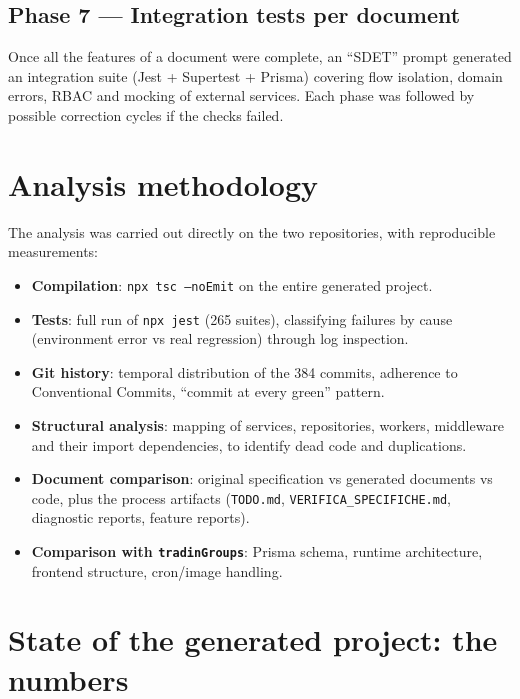 \documentclass[11pt,a4paper]{article}
\newcommand{\file}[1]{\texttt{\small #1}}
\begin{document}
\subsection{Phase 7 --- Integration tests per document}
Once all the features of a document were complete, an ``SDET'' prompt generated an integration suite (Jest + Supertest + Prisma) covering flow isolation, domain errors, RBAC and mocking of external services. Each phase was followed by possible correction cycles if the checks failed.

\section{Analysis methodology}

The analysis was carried out directly on the two repositories, with reproducible measurements:

\begin{itemize}[leftmargin=1.5em]
  \item \textbf{Compilation}: \file{npx tsc --noEmit} on the entire generated project.
  \item \textbf{Tests}: full run of \file{npx jest} (265 suites), classifying failures by cause (environment error vs real regression) through log inspection.
  \item \textbf{Git history}: temporal distribution of the 384 commits, adherence to Conventional Commits, ``commit at every green'' pattern.
  \item \textbf{Structural analysis}: mapping of services, repositories, workers, middleware and their import dependencies, to identify dead code and duplications.
  \item \textbf{Document comparison}: original specification vs generated documents vs code, plus the process artifacts (\file{TODO.md}, \file{VERIFICA\_SPECIFICHE.md}, diagnostic reports, feature reports).
  \item \textbf{Comparison with \file{tradinGroups}}: Prisma schema, runtime architecture, frontend structure, cron/image handling.
\end{itemize}

\section{State of the generated project: the numbers}
\end{document}
